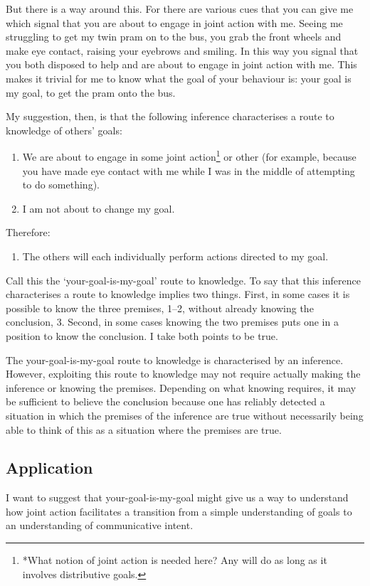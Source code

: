 \documentclass[12pt,a4paper]{extarticle}
\begin{document}
But there is a way around this.  For there are various cues that you can give me which signal that you are about to engage in joint action with me.  Seeing me struggling to get my twin pram on to the bus, you grab the front wheels and make eye contact, raising your eyebrows and smiling.  In this way you signal that you both disposed to help and are about to engage in joint action with me.  This makes it trivial for me to know what the goal of your behaviour is: your goal is my goal, to get the pram onto the bus.

My suggestion, then, is that the following inference characterises a route to knowledge of others’ goals:
%
\begin{enumerate}
\item We are about to engage in some joint action\footnote{
*What notion of joint action is needed here?  Any will do as long as it involves distributive goals.
}
or other (for example, because you have made eye contact with me while I was in the middle of attempting to do something).

\item I am not about to change my goal.

\end{enumerate}
%
Therefore:
%
\begin{enumerate}[resume]
%
\item The others will each individually perform actions directed to my goal.
\end{enumerate}
%
Call this the ‘your-goal-is-my-goal’ route to knowledge.  To say that this inference characterises a route to knowledge implies two things.  First, in some cases it is possible to know the three premises, 1–2, without already knowing the conclusion, 3.  Second, in some cases knowing the two premises puts one in a position to know the conclusion.  I take both points to be true.

The your-goal-is-my-goal route to knowledge is characterised by an inference.  However, exploiting this route to knowledge may not require actually making the inference or knowing the premises.  Depending on what knowing requires, it may be sufficient to believe the conclusion because one has reliably detected a situation in which the premises of the inference are true without necessarily being able to think of this as a situation where the premises are true.


\subsection{Application}
I want to suggest that your-goal-is-my-goal might give us a way to understand how joint action facilitates a transition from a simple understanding of goals to an understanding of communicative intent.
\end{document}
